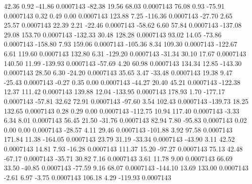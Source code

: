        42.36        0.92      -41.86     0.0007143
      -82.38       19.56       68.03     0.0007143
       76.08        0.93      -75.91     0.0007143
        0.32        0.49        0.00     0.0007143
      123.88        7.25     -116.36     0.0007143
      -27.70        2.65       25.57     0.0007143
       22.39        2.21      -22.46     0.0007143
      -58.62        6.60       57.84     0.0007143
     -137.08       29.08      153.70     0.0007143
     -132.33       30.48      128.28     0.0007143
       93.02       14.05      -73.86     0.0007143
     -158.80        7.93      159.06     0.0007143
     -105.36        8.34      109.30     0.0007143
     -122.67        6.61      119.60     0.0007143
      132.80        6.31     -129.20     0.0007143
      -31.34       30.10       17.67     0.0007143
      140.50       11.99     -139.93     0.0007143
      -57.69        4.20       60.98     0.0007143
      134.34       12.85     -143.30     0.0007143
       28.50        6.30      -24.20     0.0007143
       35.65        3.47      -33.48     0.0007143
       19.38        9.47      -25.43     0.0007143
       -0.27        0.35        0.00     0.0007143
      -44.27       20.40       45.21     0.0007143
     -122.38       12.37      111.42     0.0007143
      139.88       12.04     -133.95     0.0007143
      178.93        1.70     -177.17     0.0007143
      -57.81       32.62       72.91     0.0007143
      -97.60        3.54      102.43     0.0007143
     -139.73       18.25      132.65     0.0007143
        0.28        0.29        0.00     0.0007143
     -112.75       10.94      117.40     0.0007143
       -3.33        6.34        8.01     0.0007143
       56.45       21.50      -31.76     0.0007143
       82.94        7.80      -95.83     0.0007143
        0.02        0.00        0.00     0.0007143
      -28.57        4.11       29.46     0.0007143
     -101.88        3.92       97.58     0.0007143
      171.84       11.38     -164.05     0.0007143
       23.79       31.19      -33.34     0.0007143
      -43.90        3.11       42.52     0.0007143
       14.81        7.93      -16.28     0.0007143
      111.37       15.20      -97.27     0.0007143
       75.13       42.48      -67.17     0.0007143
      -35.71       30.82        7.16     0.0007143
        3.61       11.78        9.00     0.0007143
       66.69       33.50      -40.85     0.0007143
      -77.59        9.16       68.07     0.0007143
     -144.10       13.69      133.00     0.0007143
       -2.61        6.97       -3.75     0.0007143
      106.18        4.29     -119.93     0.0007143
